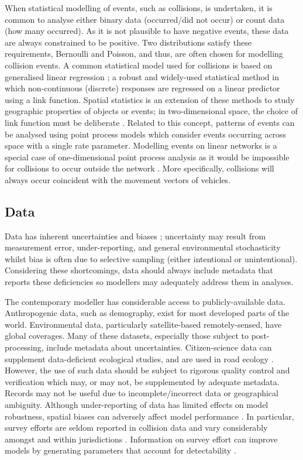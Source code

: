 When statistical modelling of events, such as collisions, is undertaken, it is common to analyse either binary data (occurred/did not occur) or count data (how many occurred).  As it is not plausible to have negative events, these data are always constrained to be positive. Two distributions satisfy these requirements, Bernoulli and Poisson, and thus, are often chosen for modelling collision events. A common statistical model used for collisions is based on generalised linear regression \citep{mccu89}; a robust and widely-used statistical method in which non-continuous (discrete) responses are regressed on a linear predictor using a link function. Spatial statistics is an extension of these methods to study geographic properties of objects or events; in two-dimensional space, the choice of link function must be deliberate \citep{badd10}. Related to this concept, patterns of events can be analysed using point process models which consider events occurring across space with a single rate parameter. Modelling events on linear networks is a special case of one-dimensional point process analysis as it would be impossible for collisions to occur outside the network \citep{okab09}.  More specifically, collisions will always occur coincident with the movement vectors of vehicles.

\subsection{Data}

Data has inherent uncertainties and biases \citep{glym97}; uncertainty may result from measurement error, under-reporting, and general environmental stochasticity whilst bias is often due to selective sampling (either intentional or unintentional). Considering these shortcomings, data should always include metadata that reports these deficiencies so modellers may adequately address them in analyses.

The contemporary modeller has considerable access to publicly-available data. Anthropogenic data, such as demography, exist for most developed parts of the world. Environmental data, particularly satellite-based remotely-sensed, have global coverages. Many of these datasets, especially those subject to post-processing, include metadata about uncertainties. Citizen-science data can supplement data-deficient ecological studies, and are used in road ecology \citep{paul14}. However, the use of such data should be subject to rigorous quality control and verification which may, or may not, be supplemented by adequate metadata. Records may not be useful due to incomplete/incorrect data or geographical ambiguity. Although under-reporting of data has limited effects on model robustness, spatial biases can adversely affect model performance \citep{snow15}. In particular, survey efforts are seldom reported in collision data and vary considerably amongst and within jurisdictions \citep{huij07a}. Information on survey effort can improve models by generating parameters that account for detectability \citep{dora14}.

